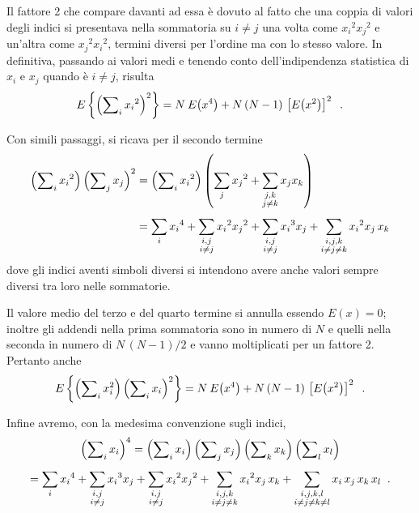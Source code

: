 Il fattore 2 che compare davanti ad essa \`e dovuto al fatto
che una coppia di valori degli indici si presentava nella
sommatoria su $i \neq j$ una volta come ${x_i}^2 {x_j}^2$ e
un'altra come ${x_j}^2 {x_i}^2$, termini diversi per
l'ordine ma con lo stesso valore.  In definitiva, passando
ai valori medi e tenendo conto dell'indipendenza statistica
di $x_i$ e $x_j$ quando \`e $i \neq j$, risulta
\begin{equation*}
  E \left \{ \left( \sum \nolimits_i {x_i}^2 \right) ^2
    \right \} = N \: E \bigl( x^4 \bigr) + N \, (N-1) \,
    \left[ E \bigl( x^2 \bigr) \right] ^2 \;\; .
\end{equation*}

Con simili passaggi, si ricava per il secondo termine
\begin{align*}
   \left( \sum \nolimits_i {x_i}^2 \right)
     \Bigl( \sum \nolimits_j x_j \Bigr) ^2 &=
     \left( \sum \nolimits_i {x_i}^2 \right)
     \left( \sum_j {x_j}^2 +
     \sum_{\substack{j,k\\ j \neq k}} x_j x_k
     \right) \\[1ex]
   &= \sum_i {x_i}^4 +
     \sum_{\substack{i,j\\ i \neq j}} {x_i}^2
     {x_j}^2 + \sum_{\substack{i,j\\ i \neq j}}
     {x_i}^3 x_j + \sum_{\substack{i,j,k\\ i \neq j
     \neq k}} {x_i}^2 x_j \, x_k
\end{align*}
dove gli indici aventi simboli diversi si intendono avere
anche valori sempre diversi tra loro nelle sommatorie.

Il valore medio del terzo e del quarto termine si annulla
essendo $E(x)=0$; inoltre gli addendi nella prima sommatoria
sono in numero di $N$ e quelli nella seconda in numero di $N
\, (N-1) /2$ e vanno moltiplicati per un fattore 2.
Pertanto anche
\begin{equation*}
  E \left \{ \left( \sum \nolimits_i x_i^2 \right)
    \left( \sum \nolimits_i x_i \right) ^2 \right \} =
    N \: E \bigl( x^4 \bigr) +
    N \, (N-1) \, \left[ E \bigl( x^2 \bigr) \right] ^2 \;\;
    .
\end{equation*}

Infine avremo, con la medesima convenzione sugli indici,
\begin{multline*}
   \left( \sum \nolimits_i x_i \right) ^4 =
     \left( \sum \nolimits_i x_i \right)
     \Bigl( \sum \nolimits_j x_j \Bigr)
     \left( \sum \nolimits_k x_k \right)
     \left( \sum \nolimits_l x_l \right) \\[1ex]
   = \sum_i {x_i}^4 +
     \sum_{\substack{i,j \\ i \neq j}} {x_i}^3 x_j +
     \sum_{\substack{i,j \\ i \neq j}} {x_i}^2 {x_j}^2 +
     \sum_{\substack{i,j,k \\i \neq j \neq k}} {x_i}^2
       x_j \, x_k +
     \sum_{\substack{i,j,k,l \\ i \neq j \neq k \neq l}}
       x_i \, x_j \, x_k \, x_l \;\; .
\end{multline*}

